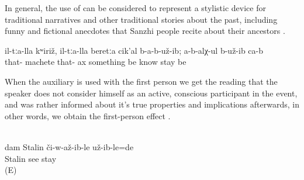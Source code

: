 In general, the use of  can be considered to represent a stylistic device for traditional narratives and other traditional stories about the past, including funny and fictional anecdotes that Sanzhi people recite about their ancestors .
%
\begin{exe}
	\ex	\label{ex:they had no machete nor ax, they did not know (these tools)}
	\gll	il-tːa-lla	kʷiriž,	il-tːa-lla	beretːa	cik'al	b-a-b-už-ib;	a-b-alχ-ul	b-už-ib	ca-b\\
		that-	machete	that-	ax	something	be	know	stay	be\\
	\glt	{}
\end{exe}

When the auxiliary is used with the first person we get the reading that the speaker does not consider himself as an active, conscious participant in the event, and was rather informed about it's true properties and implications afterwards, in other words, we obtain the first-person effect .
%
\begin{exe}
	\\\label{ex:(It turned out, that) I had seen Stalin@17}%
	\gll	dam	Stalin	či-w-až-ib-le	už-ib-le=de\\
			Stalin	see	stay\\
	\glt	{} (E)
\end{exe}



%
%
